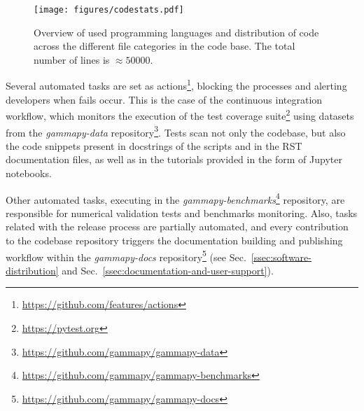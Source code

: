 \documentclass[traditabstract, longauth]{aa}
\begin{document}

\begin{figure}[t]
	\centering
	\texttt{[image: figures/codestats.pdf]}
	\caption{
		Overview of used programming languages and distribution of code across the different file
        categories in the \gammapy code base. The total number of lines is $\approx 50 000$.
    }
	\label{fig:codestats:lang}
\end{figure}

Several automated tasks are set as \github
actions\footnote{\url{https://github.com/features/actions}}, blocking the
processes and alerting developers when fails occur. This is the case of the
continuous integration workflow, which monitors the execution of the test coverage
suite\footnote{\url{https://pytest.org}} using datasets from the
\textit{gammapy-data} repository\footnote{\url{https://github.com/gammapy/gammapy-data}}.
Tests scan not only the codebase, but also the
code snippets present in docstrings of the scripts and in the RST documentation
files, as well as in the tutorials provided in the form of Jupyter notebooks.

Other automated tasks, executing in the
\textit{gammapy-benchmarks}\footnote{\url{https://github.com/gammapy/gammapy-benchmarks}} repository,
are responsible for numerical validation tests and benchmarks monitoring. Also,
tasks related with the release process are partially automated, and every
contribution to the codebase repository triggers the documentation building and
publishing workflow within the
\textit{gammapy-docs} repository\footnote{\url{https://github.com/gammapy/gammapy-docs}}
(see Sec.~\ref{ssec:software-distribution} and Sec.~\ref{ssec:documentation-and-user-support}).
\end{document}
